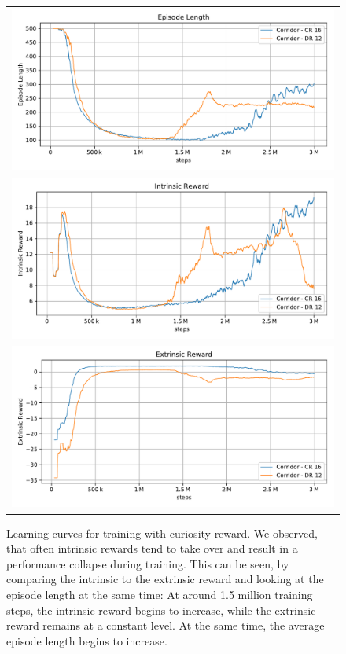 \begin{figure}[htp]
    
    \begin{center}
        \begin{tabular}{c}
            \includegraphics[clip, width=0.75\columnwidth]{figures/evaluation/rewards/curiosity_divergence_ep_len.pdf} \\
            \includegraphics[clip, width=0.75\columnwidth]{figures/evaluation/rewards/curiosity_divergence_int_rew.pdf} \\
            \includegraphics[clip, width=0.75\columnwidth]{figures/evaluation/rewards/curiosity_divergence_ext_rew.pdf}
        \end{tabular}

    \end{center}
    
    \caption[Problems with Curiosity Reward]{Learning curves for training with curiosity reward. We observed, that often intrinsic rewards tend to take over and result in a performance collapse during training. This can be seen, by comparing the intrinsic to the extrinsic reward and looking at the episode length at the same time: At around 1.5 million training steps, the intrinsic reward begins to increase, while the extrinsic reward remains at a constant level. At the same time, the average episode length begins to increase.}
    \label{fig:CuriosityDiverge}
\end{figure}


